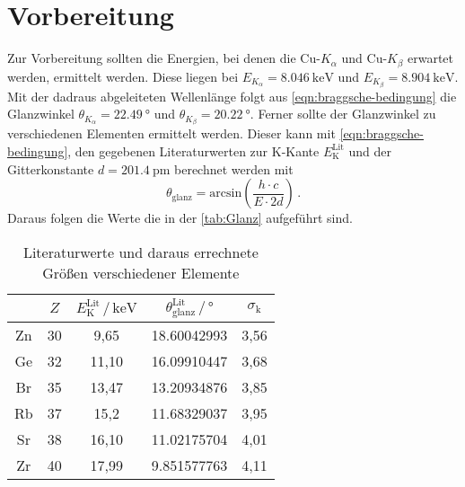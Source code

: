 \section{Vorbereitung}
Zur Vorbereitung sollten die Energien, bei denen die Cu-$K_\alpha$ und Cu-$K_\beta$
erwartet werden, ermittelt werden. Diese liegen bei $E_{K_\alpha} = \SI{8.046}{\kilo\eV}$ und 
$E_{K_\beta} = \SI{8.904}{\kilo\eV}$. Mit der dadraus abgeleiteten Wellenlänge folgt aus
\autoref{eqn:braggsche-bedingung} die Glanzwinkel $\theta_{K_\alpha} = \SI{22.49}{\degree}$ 
und $\theta_{K_\beta} = \SI{20.22}{\degree}$.
Ferner sollte der Glanzwinkel zu verschiedenen Elementen ermittelt 
werden. Dieser kann mit \autoref{eqn:braggsche-bedingung}, den gegebenen Literaturwerten 
zur K-Kante $E_\text{K}^\text{Lit}$ \cite{wissen} und der Gitterkonstante 
$d = \SI{201.4}{\pico\meter}$ berechnet werden mit 
\begin{equation}
	\theta_\text{glanz} = \text{arcsin}\left(\frac{h \cdot c}{E \cdot 2d}\right) \, .
	\label{eqn:theta}
\end{equation}
Daraus folgen die Werte die in der \autoref{tab:Glanz} aufgeführt sind. 
\begin{table}
	\centering
	\caption{Literaturwerte und daraus errechnete Größen verschiedener Elemente}
	\label{tab:Glanz}
	\begin{tabular}{c c c c c}
		\toprule
		$ $ & $Z$ & $E_\text{K}^\text{Lit} \,/\, \si{\kilo\eV}$
		    & $\theta_\text{glanz}^\text{Lit} \,/\, \si{\degree}$ & 
		    $\sigma_\text{k}$\\
		    \midrule 
		Zn & 30 &  9,65 & 18.60042993 & 3,56 \\
		Ge & 32 & 11,10 & 16.09910447 & 3,68 \\
		Br & 35 & 13,47 & 13.20934876 & 3,85 \\
		Rb & 37 & 15,2 & 11.68329037 & 3,95 \\
		Sr & 38 & 16,10 & 11.02175704 & 4,01 \\
		Zr & 40 & 17,99 &  9.851577763 & 4,11 \\
		\bottomrule
	\end{tabular}
\end{table}

